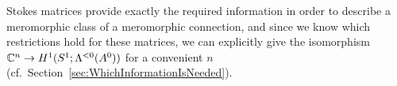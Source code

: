 Stokes matrices provide exactly the required information in order to describe a
meromorphic class of a meromorphic connection, and since we know which
restrictions hold for these matrices, we can explicitly give the isomorphism
$\mathbb{C}^n\to H^1(S^1;\Lambda^{<0}(A^0))$ for a convenient $n$
(cf.\ Section~\ref{sec:WhichInformationIsNeeded}).

\begin{comment}
  \begin{enumerate}
    \item first introduce asymptotic analysis
    \item then define languages for meromorphic connections or systems
    \item talk about Stokes structures
    \item more?
  \end{enumerate}
\end{comment}

